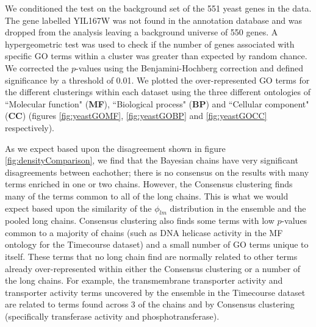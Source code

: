 \documentclass[]{article}
\begin{document}
We conditioned the test on the background set of the 551 yeast genes in the data. The gene labelled YIL167W was not found in the annotation database and was dropped from the analysis leaving a background universe of 550 genes. A hypergeometric test was used to check if the number of genes associated with specific GO terms within a cluster was greater than expected by random chance. We corrected the $p$-values using the Benjamini-Hochberg correction \citep{benjamini1995controlling} and defined significance by a threshold of 0.01. We plotted the over-represented GO terms for the different clusterings within each dataset using the three different ontologies of ``Molecular function" (\textbf{MF}), ``Biological process" (\textbf{BP}) and ``Cellular component" (\textbf{CC}) (figures \ref{fig:yeastGOMF}, \ref{fig:yeastGOBP} and \ref{fig:yeastGOCC} respectively). 

As we expect based upon the disagreement shown in figure \ref{fig:densityComparison}, we find that the Bayesian chains have very significant disagreements between eachother; there is no consensus on the results with many terms enriched in one or two chains. However, the Consensus clustering finds many of the terms common to all of the long chains. This is what we would expect based upon the similarity of the $\phi_{lm}$ distribution in the ensemble and the pooled long chains. Consensus clustering also finds some terms with low $p$-values common to a majority of chains (such as DNA helicase activity in the MF ontology for the Timecourse dataset) and a small number of GO terms unique to itself. These terms that no long chain find are normally related to other terms already over-represented within either the Consensus clustering or a number of the long chains. For example, the transmembrane transporter activity and transporter activity terms uncovered by the ensemble in the Timecourse dataset are related to terms found across 3 of the chains and by Consensus clustering (specifically transferase activity and phosphotransferase). 


\end{document}
